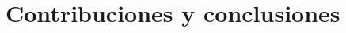 %
%
%
%


\section{Contribuciones y conclusiones}
\label{sec:appendix-spanishsummary:conclusiones}

